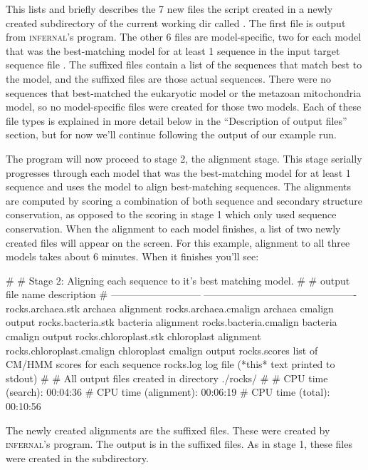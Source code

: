 This lists and briefly describes the 7 new files the script created in
a newly created subdirectory of the current working dir called
. The first file  is output from
\textsc{infernal}'s  program. The other 6 files are
model-specific, two for each model that was the best-matching model for
at least 1 sequence in the input target sequence file
. The  suffixed files contain a list
of the sequences that match best to the model, and the 
suffixed files are those actual sequences. There were no sequences
that best-matched the eukaryotic model or the metazoan mitochondria
model, so no model-specific files were created for those two models.
Each of these file types is explained in more detail below in the
``Description of output files'' section, but for now we'll continue
following the output of our example  run.

The program will now proceed to stage 2, the alignment stage. This
stage serially progresses through each model that was the
best-matching model for at least 1 sequence and uses the model to
align best-matching sequences. The alignments are computed by scoring
a combination of both sequence and secondary structure conservation,
as opposed to the scoring in stage 1 which only used sequence
conservation. When the alignment to each model finishes, a list of two
newly created files will appear on the screen. For this example,
alignment to all three models takes about 6 minutes. When it finishes
you'll see:

\begin{sreoutput}
#
# Stage 2: Aligning each sequence to it's best matching model.
#
# output file name             description
# ---------------------------  ----------------------------------------------
  rocks.archaea.stk            archaea alignment
  rocks.archaea.cmalign        archaea cmalign output
  rocks.bacteria.stk           bacteria alignment
  rocks.bacteria.cmalign       bacteria cmalign output
  rocks.chloroplast.stk        chloroplast alignment
  rocks.chloroplast.cmalign    chloroplast cmalign output
  rocks.scores                 list of CM/HMM scores for each sequence
  rocks.log                    log file (*this* text printed to stdout)
#
# All output files created in directory ./rocks/
#
# CPU time (search):     00:04:36
# CPU time (alignment):  00:06:19
# CPU time (total):      00:10:56
\end{sreoutput}

The newly created alignments are the  suffixed files. These
were created by \textsc{infernal}'s  program. The
 output is in the  suffixed files.  As in
stage 1, these files were created in the  subdirectory.

